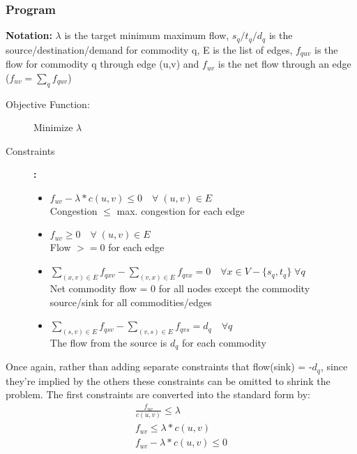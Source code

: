 \subsubsection{Program}
\textbf{Notation:} $\lambda$ is the target minimum maximum flow, $s_q/t_q/d_q$ is the source/destination/demand for commodity q, E is the list of edges, $f_{quv}$ is the flow for commodity q through edge (u,v) and $f_{uv}$ is the net flow through an edge ($f_{uv} = \sum_qf_{quv}$)
\begin{description}
\item [Objective Function:] Minimize $\lambda$
\item [Constraints]\textbf{:}  
\begin{itemize}
    \item \(f_{uv} - \lambda * c(u,v)  \leq 0 \quad \forall \;(u,v) \in E\) \\ Congestion $\leq$ max. congestion for each edge
    \item \(f_{uv} \geq 0 \quad \forall \;(u,v) \in E\) \\ Flow $>=0$ for each edge
    \item \(\sum_{(x,v)\in E} f_{qxv} - \sum_{(v,x)\in E} f_{qvx} = 0 \quad \forall x \in V-\{s_q,t_q\}\; \forall q \) \\ Net commodity flow = 0 for all nodes except the commodity source/sink for all commodities/edges
    \item \(\sum_{(s,v)\in E} f_{qsv} - \sum_{(v,s)\in E} f_{qvs} = d_q \quad \forall q\) \\ The flow from the source is $d_q$ for each commodity
    \end{itemize}
\end{description}
Once again, rather than adding separate constraints that flow(sink) = -$d_q$, since they're implied by the others these constraints can be omitted to shrink the problem. The first constraints are converted into the standard form by:
\begin{align}
    \frac{f_{uv}}{c(u,v)} \leq \lambda \nonumber \\
    f_{uv} \leq \lambda * c(u,v) \nonumber \\
    f_{uv} - \lambda * c(u,v) \leq 0 \nonumber
\end{align}
